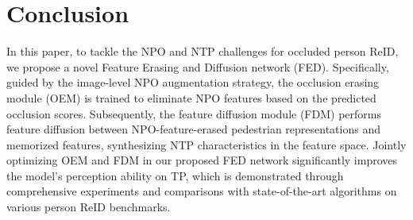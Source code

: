 \documentclass[10pt,twocolumn,letterpaper]{article}
\begin{document}
\section{Conclusion}
In this paper, to tackle the NPO and NTP challenges for occluded person ReID, we propose a novel Feature Erasing and Diffusion network (FED). Specifically, guided by the image-level NPO augmentation strategy, the occlusion erasing module (OEM) is trained to eliminate NPO features based on the predicted occlusion scores. Subsequently, the feature diffusion module (FDM) performs feature diffusion between NPO-feature-erased pedestrian representations and memorized features, synthesizing NTP characteristics in the feature space. Jointly optimizing OEM and FDM in our proposed FED network significantly improves the model's perception ability on TP, which is demonstrated through comprehensive experiments and comparisons with state-of-the-art algorithms on various person ReID benchmarks.




\newpage
\end{document}
